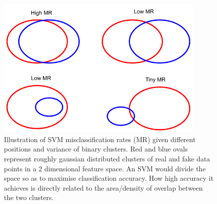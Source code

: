 \begin{figure}
    \centering
    \includegraphics[width=0.9\textwidth]{./figures/VennDiagram.png}
    \caption{Illustration of SVM misclassification rates (MR) given different positions and variance of binary clusters. Red and blue ovals represent roughly gaussian distributed clusters of real and fake data points in a 2 dimensional feature space. An SVM would divide the space so as to maximise classification accuracy. How high accuracy it achieves is directly related to the area/density of overlap between the two clusters.}
    \label{fig:low_var_high_var_svm_clumps}
\end{figure}






